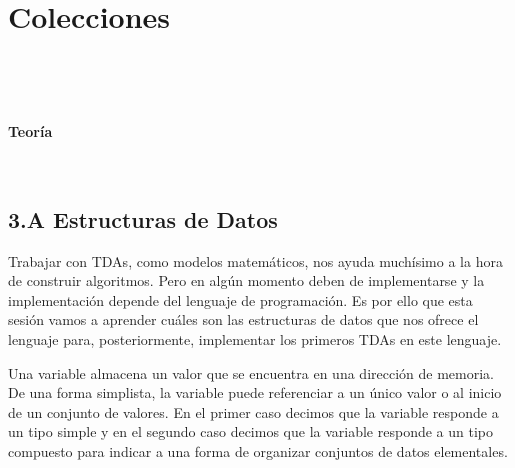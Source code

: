 
\chapter{Colecciones} \label{chap:secuenciasPython}

\localtableofcontents

\

\

\centerline{\Large \bf Teoría}

\formatoNormal



\







\section*{3.A Estructuras de Datos}


Trabajar con TDAs, como modelos matemáticos, nos ayuda muchísimo a la hora de construir algoritmos. Pero en algún momento deben de implementarse y la implementación depende del lenguaje de programación. Es por ello que esta sesión vamos a aprender cuáles son las estructuras de datos que nos ofrece el lenguaje  para, posteriormente, implementar los primeros TDAs en este lenguaje.




Una variable almacena un valor que se encuentra en una dirección de memoria.
De una forma simplista, la variable puede referenciar a un único valor o al inicio de un conjunto de valores. En el primer caso decimos que la variable responde a un tipo simple y en el segundo caso decimos que la variable responde a un tipo compuesto para indicar a una forma de organizar conjuntos de datos elementales. 

